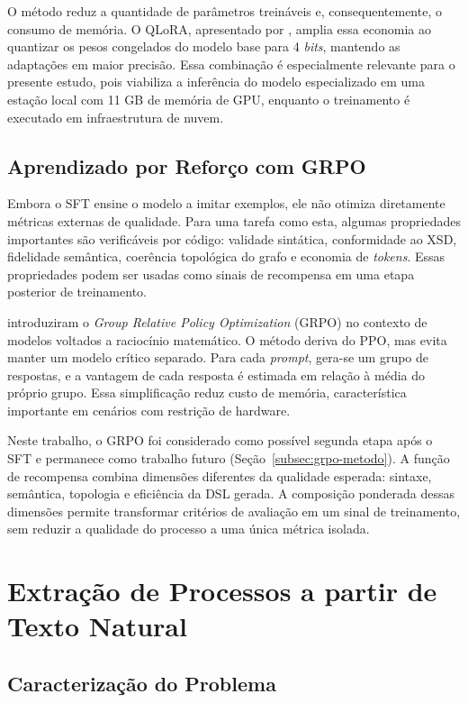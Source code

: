 O método reduz a quantidade de parâmetros treináveis e, consequentemente, o consumo de memória. O QLoRA, apresentado por , amplia essa economia ao quantizar os pesos congelados do modelo base para 4 \textit{bits}, mantendo as adaptações em maior precisão. Essa combinação é especialmente relevante para o presente estudo, pois viabiliza a inferência do modelo especializado em uma estação local com 11 GB de memória de GPU, enquanto o treinamento é executado em infraestrutura de nuvem.

\subsection{Aprendizado por Reforço com GRPO}
\label{subsec:grpo}

Embora o SFT ensine o modelo a imitar exemplos, ele não otimiza diretamente métricas externas de qualidade. Para uma tarefa como esta, algumas propriedades importantes são verificáveis por código: validade sintática, conformidade ao XSD, fidelidade semântica, coerência topológica do grafo e economia de \textit{tokens}. Essas propriedades podem ser usadas como sinais de recompensa em uma etapa posterior de treinamento.

 introduziram o \textit{Group Relative Policy Optimization} (GRPO) no contexto de modelos voltados a raciocínio matemático. O método deriva do PPO, mas evita manter um modelo crítico separado. Para cada \textit{prompt}, gera-se um grupo de respostas, e a vantagem de cada resposta é estimada em relação à média do próprio grupo. Essa simplificação reduz custo de memória, característica importante em cenários com restrição de hardware.

Neste trabalho, o GRPO foi considerado como possível segunda etapa após o SFT e permanece como trabalho futuro (Seção~\ref{subsec:grpo-metodo}). A função de recompensa combina dimensões diferentes da qualidade esperada: sintaxe, semântica, topologia e eficiência da DSL gerada. A composição ponderada dessas dimensões permite transformar critérios de avaliação em um sinal de treinamento, sem reduzir a qualidade do processo a uma única métrica isolada.

\section{Extração de Processos a partir de Texto Natural}
\label{sec:nl-bpmn}

\subsection{Caracterização do Problema}
\label{subsec:nl-problema}

